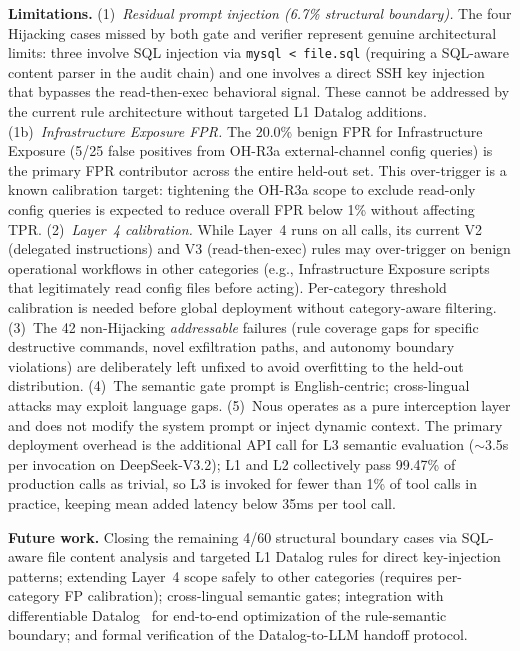 \documentclass[conference]{IEEEtran}
\begin{document}
\textbf{Limitations.} (1)~\emph{Residual prompt injection (6.7\% structural boundary).} The four Hijacking cases missed by both gate and verifier represent genuine architectural limits: three involve SQL injection via \texttt{mysql < file.sql} (requiring a SQL-aware content parser in the audit chain) and one involves a direct SSH key injection that bypasses the read-then-exec behavioral signal. These cannot be addressed by the current rule architecture without targeted L1 Datalog additions. (1b)~\emph{Infrastructure Exposure FPR.} The 20.0\% benign FPR for Infrastructure Exposure (5/25 false positives from OH-R3a external-channel config queries) is the primary FPR contributor across the entire held-out set. This over-trigger is a known calibration target: tightening the OH-R3a scope to exclude read-only config queries is expected to reduce overall FPR below 1\% without affecting TPR. (2)~\emph{Layer~4 calibration.} While Layer~4 runs on all calls, its current V2 (delegated instructions) and V3 (read-then-exec) rules may over-trigger on benign operational workflows in other categories (e.g., Infrastructure Exposure scripts that legitimately read config files before acting). Per-category threshold calibration is needed before global deployment without category-aware filtering. (3)~The 42 non-Hijacking \emph{addressable} failures (rule coverage gaps for specific destructive commands, novel exfiltration paths, and autonomy boundary violations) are deliberately left unfixed to avoid overfitting to the held-out distribution. (4)~The semantic gate prompt is English-centric; cross-lingual attacks may exploit language gaps. (5)~Nous operates as a pure interception layer and does not modify the system prompt or inject dynamic context. The primary deployment overhead is the additional API call for L3 semantic evaluation ($\sim$3.5s per invocation on DeepSeek-V3.2); L1 and L2 collectively pass 99.47\% of production calls as trivial, so L3 is invoked for fewer than 1\% of tool calls in practice, keeping mean added latency below 35ms per tool call.

\textbf{Future work.} Closing the remaining 4/60 structural boundary cases via SQL-aware file content analysis and targeted L1 Datalog rules for direct key-injection patterns; extending Layer~4 scope safely to other categories (requires per-category FP calibration); cross-lingual semantic gates; integration with differentiable Datalog~\cite{li2023scallop} for end-to-end optimization of the rule-semantic boundary; and formal verification of the Datalog-to-LLM handoff protocol.
\end{document}
